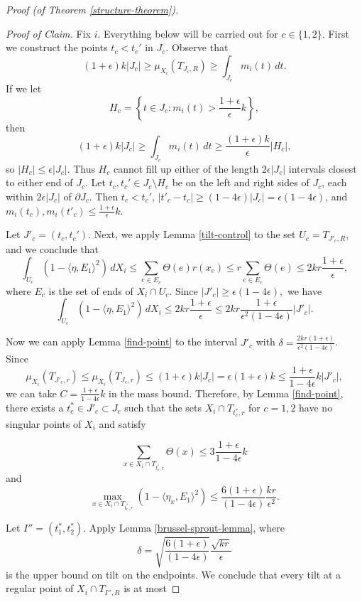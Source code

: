 \documentclass[11pt,reqno,twoside]{amsart}
\theoremstyle{definition}
\begin{document}
\begin{proof}[Proof (of Theorem \ref{structure-theorem})]
\

\emph{Proof of Claim.} Fix $i$. Everything below will be carried out for $c \in \{1,2\}$. 
First we construct the points $t_c < t_c'$ in $J_c$. Observe that
\[(1+\epsilon)k|J_c| \geq \mu_{X_i}(T_{J_c,R}) \geq \int_{J_c} m_i(t) \, dt.\]
If we let
\[H_c = \left\{t \in J_c: m_i(t) > \frac{1+\epsilon}{\epsilon}k\right\},\]
then
\[(1+\epsilon)k|J_c| \geq \int_{J_c} m_i(t) \, dt \geq \frac{(1+\epsilon)k}{\epsilon}|H_c|,\]
so $|H_c| \leq \epsilon |J_c|.$ Thus $H_c$ cannot fill up either of the length $2\epsilon |J_c|$ intervals closest to either end of $J_c$. Let $t_c,t_c' \in J_c \setminus H_c$ be on the left and right sides of $J_c$, each within $2\epsilon |J_c|$ of $\partial J_c$. Then $t_c < t_c'$, $|t'_c - t_c| \geq (1-4\epsilon)|J_c| = \epsilon(1-4\epsilon)$, and $m_i(t_c),m_i(t'_c) \leq \frac{1+\epsilon}{\epsilon}k.$

Let $J'_c = (t_c,t_c')$. Next, we apply Lemma \ref{tilt-control} to the set $U_c = T_{J'_c,R}$, and we conclude that
\[\int_{U_c} (1-\langle \eta,E_1\rangle^2) \, dX_i \leq \sum_{e \in E_c} \Theta(e) r(x_e) \leq r\sum_{e \in E_c}\Theta(e) \leq 2kr \frac{1+\epsilon}{\epsilon},\]
where $E_c$ is the set of ends of $X_i \cap U_c$. Since $|J'_c| \geq \epsilon(1-4\epsilon),$ we have 
\[\int_{U_c} (1-\langle \eta,E_1\rangle^2) \, dX_i \leq 2kr\frac{1+\epsilon}{\epsilon} \leq 2kr \frac{1+\epsilon}{\epsilon^2(1-4\epsilon)} |J'_c|.\]

Now we can apply Lemma \ref{find-point} to the interval $J'_c$ with $\delta = \frac{2kr(1+\epsilon)}{\epsilon^2(1-4\epsilon)}$. Since
\[\mu_{X_i}(T_{J'_c,r}) \leq \mu_{X_i}(T_{J_c,r}) \leq (1+\epsilon)k |J_c| = \epsilon(1+\epsilon)k \leq \frac{1+\epsilon}{1-4\epsilon}k |J'_c|,\]
we can take $C = \frac{1+\epsilon}{1-4\epsilon}k$ in the mass bound. Therefore, by Lemma \ref{find-point}, there exists a $t^*_c \in J'_c \subset J_c$ such that the sets $X_i \cap T_{t_c^*,r}$ for $c=1,2$ have no singular points of $X_i$ and satisfy

\[\sum_{x \in X_i \cap T_{t_c^*,r}
} \Theta(x) \leq 3\frac{1+\epsilon}{1-4\epsilon} k\]
and
\[\max_{x \in X_i \cap T_{t_c^*,r}} (1-\langle \eta_x,E_1\rangle^2) \leq \frac{6(1+\epsilon)}{(1-4\epsilon)}\frac{kr}{\epsilon^2}.\]

Let $I'' = (t_1^*,t_2^*)$. Apply Lemma \ref{brussel-sprout-lemma}, where \[ \delta = \sqrt{\frac{6(1+\epsilon)}{(1-4\epsilon)}}\frac{\sqrt{kr}}{\epsilon} \]
is the upper bound on tilt on the endpoints. We conclude that every tilt at a regular point of $X_i \cap T_{I'',R}$ is at most


\end{proof}
\end{document}
